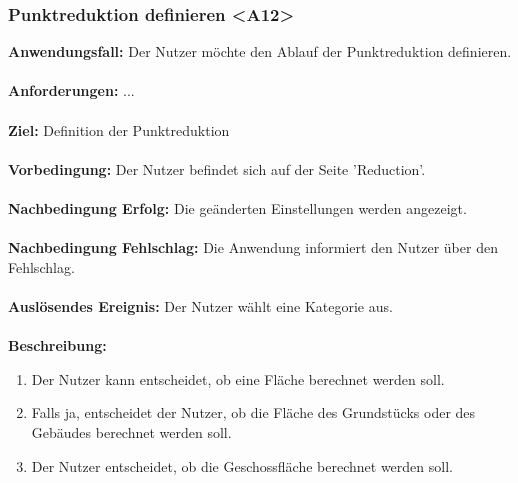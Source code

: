 \documentclass[parskip=full]{scrartcl} %
\begin{document}
\subsubsection*{Punktreduktion definieren <A12>}
\textbf{Anwendungsfall:} Der Nutzer möchte den Ablauf der Punktreduktion definieren.\\\\
\textbf{Anforderungen:} ...\\\\
\textbf{Ziel:} Definition der Punktreduktion \\\\
\textbf{Vorbedingung:} Der Nutzer befindet sich auf der Seite 'Reduction'.\\\\
\textbf{Nachbedingung Erfolg:} Die geänderten Einstellungen werden angezeigt. \\\\
\textbf{Nachbedingung Fehlschlag:} Die Anwendung informiert den Nutzer über den Fehlschlag. \\\\
\textbf{Auslösendes Ereignis:} Der Nutzer wählt eine Kategorie aus. \\\\
\textbf{Beschreibung:}
\begin{enumerate}
    \item Der Nutzer kann entscheidet, ob eine Fläche berechnet werden soll.
    \item Falls ja, entscheidet der Nutzer, ob die Fläche des Grundstücks oder des Gebäudes berechnet werden soll.
    \item Der Nutzer entscheidet, ob die Geschossfläche berechnet werden soll.
\end{enumerate}
\newpage
\end{document}
